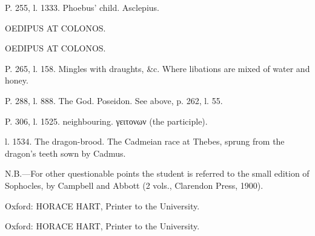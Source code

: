 \documentclass[11pt,letter]{book}
\begin{document}
\par  P. 255, l. 1333. Phoebus’ child. Asclepius.

\par  OEDIPUS AT COLONOS.

\par  OEDIPUS AT COLONOS.

\par  P. 265, l. 158. Mingles with draughts, &c. Where libations are mixed of water and honey.

\par  P. 288, l. 888. The God. Poseidon. See above, p. 262, l. 55.

\par  P. 306, l. 1525. neighbouring. γειτονων (the participle).

\par  l. 1534. The dragon-brood. The Cadmeian race at Thebes, sprung from the dragon’s teeth sown by Cadmus.

\par  N.B.—For other questionable points the student is referred to the small edition of Sophocles, by Campbell and Abbott (2 vols., Clarendon Press, 1900).

\par  Oxford: HORACE HART, Printer to the University.

\par  Oxford: HORACE HART, Printer to the University.
 
\end{document}
